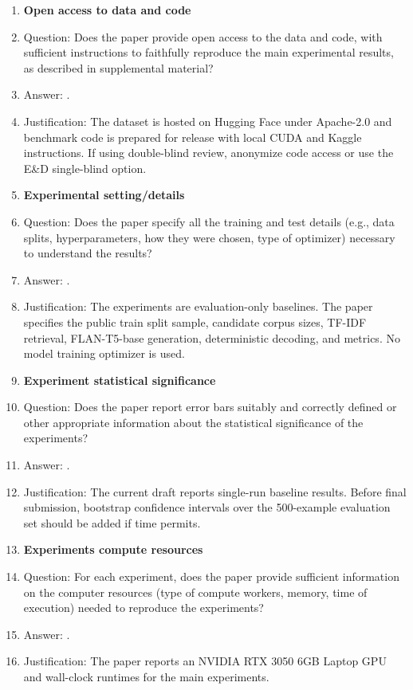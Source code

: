 \begin{enumerate}
\item {\bf Open access to data and code}
    \item[] Question: Does the paper provide open access to the data and code, with sufficient instructions to faithfully reproduce the main experimental results, as described in supplemental material?
    \item[] Answer: \answerYes{}.
    \item[] Justification: The dataset is hosted on Hugging Face under Apache-2.0 and benchmark code is prepared for release with local CUDA and Kaggle instructions. If using double-blind review, anonymize code access or use the E\&D single-blind option.

\item {\bf Experimental setting/details}
    \item[] Question: Does the paper specify all the training and test details (e.g., data splits, hyperparameters, how they were chosen, type of optimizer) necessary to understand the results?
    \item[] Answer: \answerYes{}.
    \item[] Justification: The experiments are evaluation-only baselines. The paper specifies the public train split sample, candidate corpus sizes, TF-IDF retrieval, FLAN-T5-base generation, deterministic decoding, and metrics. No model training optimizer is used.

\item {\bf Experiment statistical significance}
    \item[] Question: Does the paper report error bars suitably and correctly defined or other appropriate information about the statistical significance of the experiments?
    \item[] Answer: \answerNo{}.
    \item[] Justification: The current draft reports single-run baseline results. Before final submission, bootstrap confidence intervals over the 500-example evaluation set should be added if time permits.

\item {\bf Experiments compute resources}
    \item[] Question: For each experiment, does the paper provide sufficient information on the computer resources (type of compute workers, memory, time of execution) needed to reproduce the experiments?
    \item[] Answer: \answerYes{}.
    \item[] Justification: The paper reports an NVIDIA RTX 3050 6GB Laptop GPU and wall-clock runtimes for the main experiments.


\end{enumerate}
